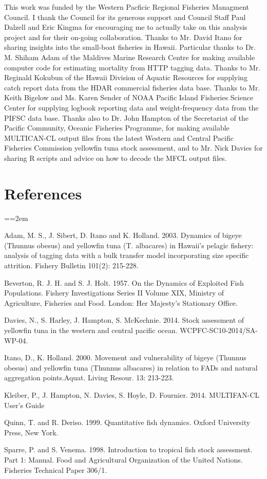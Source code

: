 \documentclass[12pt,letterpaper]{article}
\newcommand\singlespacing{\baselineskip=1.0\normalbaselineskip}
\begin{document}
\singlespacing
\vspace{4ex}
This work was funded by the Western Pacficic Regional Fisheries
Managment Council. I thank the Council for its generous support and
Council Staff Paul Dalzell and Eric Kingma for encouraging me to
actually take on this analysis project and for their on-going
collaboration.
Thanks to Mr. David Itano for sharing insights into the small-boat
fisheries in Hawaii.
Particular thanks to Dr. M. Shiham Adam of the Maldives Marine
Research Centre for making available computer code for estimating
mortality from HTTP tagging data.
Thanks to Mr. Reginald Kokubun of the Hawaii Division of Aquatic
Resources for supplying catch report data from the HDAR commercial
fisheries data base.
Thanks to Mr. Keith Bigelow and Ms. Karen Sender of NOAA Pacific
Island Fisheries Science Center for supplying logbook reporting data and
weight-frequency data from the PIFSC data base.
Thanks also to Dr. John Hampton of the Secretariat of the Pacific
Community, Oceanic Fisheries Programme, for making available
MULTICAN-CL output files from the latest Western and Central Pacific
Fisheries Commission yellowfin tuna stock assessment, and to Mr. Nick
Davies for sharing R scripts and advice on how to decode the MFCL
output files.

\section*{References}
{\parindent=0cm \small
\everypar={\hangindent=2em }\par
Adam, M. S., J. Sibert, D. Itano and K. Holland. 2003. Dynamics of
bigeye (Thunnus obesus) and yellowfin tuna (T. albacares) in Hawaii's
pelagic fishery: analysis of tagging data with a bulk transfer model
incorporating size specific attrition. Fishery Bulletin 101(2):
215-228.

Beverton, R. J. H. and S. J. Holt. 1957. On the Dynamics of Exploited
Fish Populations. Fishery Investigations Series II Volume XIX,
Ministry of Agriculture, Fisheries and Food. London: Her Majesty's
Stationary Office.

Davies, N., S. Harley, J. Hampton, S. McKechnie. 2014. Stock
assessment of yellowfin tuna in the western and central pacific ocean.
WCPFC-SC10-2014/SA-WP-04.

Itano, D., K. Holland. 2000.  Movement and vulnerability of bigeye
(Thunnus obesus) and yellowfin tuna (Thunnus albacares) in relation to
FADs and natural aggregation points.Aquat. Living Resour. 13: 213-223.

Kleiber, P., J. Hampton, N. Davies, S. Hoyle, D. Fournier. 2014.
MULTIFAN-CL User’s Guide

Quinn, T. and R. Deriso. 1999. Quantitative fish dynamics. Oxford
University Press, New York.

Sparre, P. and S. Venema. 1998. Introduction to tropical fish stock
assessment. Part 1: Manual. Food and Agricultural Organization of the
United Nations. Fisheries Technical Paper 306/1.
\par}
\end{document}
